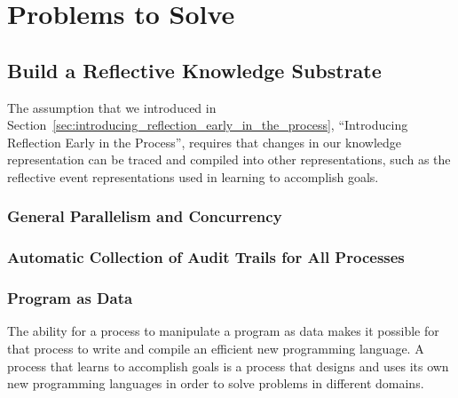 \chapter{Problems to Solve}\label{ch:problems_to_solve}

\section{Build a Reflective Knowledge Substrate}

The assumption that we introduced in
Section~\ref{sec:introducing_reflection_early_in_the_process},
``Introducing Reflection Early in the Process'', requires that changes
in our knowledge representation can be traced and compiled into other
representations, such as the reflective event representations used in
learning to accomplish goals.

\subsection{General Parallelism and Concurrency}

\subsection{Automatic Collection of Audit Trails for All Processes}

\subsection{Program as Data}

The ability for a process to manipulate a program as data makes it
possible for that process to write and compile an efficient new
programming language.  A process that learns to accomplish goals is a
process that designs and uses its own new programming languages in
order to solve problems in different domains.  




